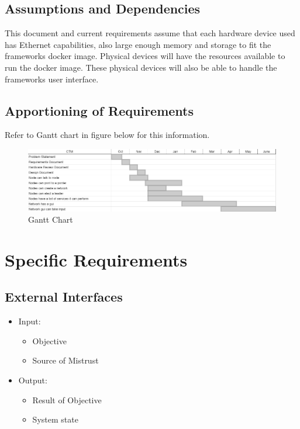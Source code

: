 \documentclass[draftclsnofoot, onecolumn, compsoc, 10pt]{IEEEtran}
\begin{document}
\subsection{Assumptions and Dependencies}
This document and current requirements assume that each hardware device used has Ethernet capabilities, also large enough memory and storage to fit the frameworks docker image. Physical devices will have the resources available to run the docker image. These physical devices will also be able to handle the frameworks user interface.

\subsection{Apportioning of Requirements}
Refer to Gantt chart in figure below for this information.
\begin{landscape}
	\begin{figure}[!htb]
		\caption{Gantt Chart}
		\centering
			\includegraphics[scale=.7]{chart}
	\end{figure}
\end{landscape}
\FloatBarrier

\section{Specific Requirements}
\subsection{External Interfaces}
\begin{itemize}
\item Input:
	\begin{itemize}
	\item Objective 
    \item Source of Mistrust
	\end{itemize}
\item Output:
	\begin{itemize}
	\item Result of Objective
    \item System state
	\end{itemize}
\end{itemize}
\end{document}
